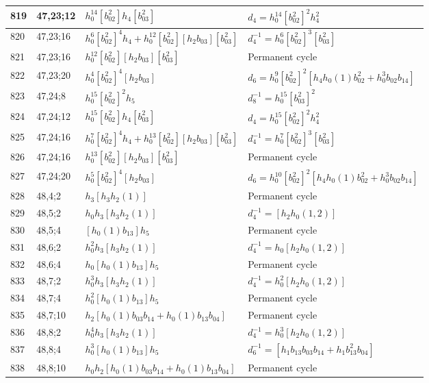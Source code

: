 \documentclass{article}
\begin{document}
\begin{longtable}{|l|l|>{\raggedright\arraybackslash}p{6cm}|>{\raggedright\arraybackslash}p{6cm}|}
\hline
819 & 47,23;12 & $h_0^{14}[b_{02}^2]h_4[b_{03}^2]$ &$d_{4}=h_0^{14}[b_{02}^2]^2h_4^2$\\
\hline
820 & 47,23;16 & $h_0^6[b_{02}^2]^4h_4 + h_0^{12}[b_{02}^2][h_2b_{03}][b_{03}^2]$ & $d_{4}^{-1}=h_0^6[b_{02}^2]^3[b_{03}^2]$\\
821 & 47,23;16 & $h_0^{12}[b_{02}^2][h_2b_{03}][b_{03}^2]$ & Permanent cycle\\
\hline
822 & 47,23;20 & $h_0^4[b_{02}^2]^4[h_2b_{03}]$ &$d_{6}=h_0^9[b_{02}^2]^2[h_4h_0(1)b_{02}^2 + h_0^3b_{02}b_{14}]$\\
\hline
823 & 47,24;8 & $h_0^{15}[b_{02}^2]^2h_5$ & $d_{8}^{-1}=h_0^{15}[b_{03}^2]^2$\\
\hline
824 & 47,24;12 & $h_0^{15}[b_{02}^2]h_4[b_{03}^2]$ &$d_{4}=h_0^{15}[b_{02}^2]^2h_4^2$\\
\hline
825 & 47,24;16 & $h_0^7[b_{02}^2]^4h_4 + h_0^{13}[b_{02}^2][h_2b_{03}][b_{03}^2]$ & $d_{4}^{-1}=h_0^7[b_{02}^2]^3[b_{03}^2]$\\
826 & 47,24;16 & $h_0^{13}[b_{02}^2][h_2b_{03}][b_{03}^2]$ & Permanent cycle\\
\hline
827 & 47,24;20 & $h_0^5[b_{02}^2]^4[h_2b_{03}]$ &$d_{6}=h_0^{10}[b_{02}^2]^2[h_4h_0(1)b_{02}^2 + h_0^3b_{02}b_{14}]$\\
\hline
828 & 48,4;2 & $h_3[h_3h_2(1)]$ & Permanent cycle\\
\hline
829 & 48,5;2 & $h_0h_3[h_3h_2(1)]$ & $d_{4}^{-1}=[h_2h_0(1, 2)]$\\
\hline
830 & 48,5;4 & $[h_0(1)b_{13}]h_5$ & Permanent cycle\\
\hline
831 & 48,6;2 & $h_0^2h_3[h_3h_2(1)]$ & $d_{4}^{-1}=h_0[h_2h_0(1, 2)]$\\
\hline
832 & 48,6;4 & $h_0[h_0(1)b_{13}]h_5$ & Permanent cycle\\
\hline
833 & 48,7;2 & $h_0^3h_3[h_3h_2(1)]$ & $d_{4}^{-1}=h_0^2[h_2h_0(1, 2)]$\\
\hline
834 & 48,7;4 & $h_0^2[h_0(1)b_{13}]h_5$ & Permanent cycle\\
\hline
835 & 48,7;10 & $h_2[h_0(1)b_{03}b_{14} + h_0(1)b_{13}b_{04}]$ & Permanent cycle\\
\hline
836 & 48,8;2 & $h_0^4h_3[h_3h_2(1)]$ & $d_{4}^{-1}=h_0^3[h_2h_0(1, 2)]$\\
\hline
837 & 48,8;4 & $h_0^3[h_0(1)b_{13}]h_5$ & $d_{6}^{-1}=[h_1b_{13}b_{03}b_{14} + h_1b_{13}^2b_{04}]$\\
\hline
838 & 48,8;10 & $h_0h_2[h_0(1)b_{03}b_{14} + h_0(1)b_{13}b_{04}]$ & Permanent cycle\\

\end{longtable}
\end{document}
